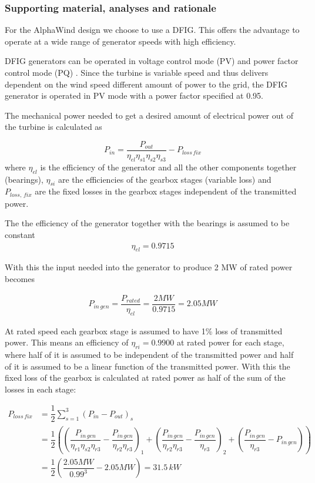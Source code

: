 \subsubsection{Supporting material, analyses and rationale}

For the AlphaWind design we choose to use a DFIG. This offers the advantage to operate at a wide range of generator speeds with high efficiency.

DFIG generators can be operated in voltage control mode (PV) and power factor control mode (PQ) \cite{Londero2012}. Since the turbine is variable speed and thus delivers dependent on the wind speed different amount of power to the grid, the DFIG generator is operated in PV mode with a power factor specified at 0.95.

The mechanical power needed to get a desired amount of electrical power out of the turbine is calculated as

\begin{equation}
    P_{in} = \dfrac{P_{out}}{\eta_{el}\eta_{s1}\eta_{s2}\eta_{s3}} - P_{loss\,fix}
    \label{eq:P_in}
\end{equation}
where $\eta_{el}$ is the efficiency of the generator and all the other components together (bearings), $\eta_{si}$ are the efficiencies of the gearbox stages (variable loss) and $P_{loss, \, fix}$ are the fixed losses in the gearbox stages independent of the transmitted power.


The the efficiency of the generator together with the bearings is assumed to be constant
\begin{align}
    \eta_{el} = 0.9715
\end{align}

With this the input needed into the generator to produce 2 MW of rated power becomes

\begin{align}
    P_{in\,gen} = \dfrac{P_{rated}}{\eta_{el}} = \dfrac{2 MW}{0.9715} = 2.05 MW
\end{align}

At rated speed each gearbox stage is assumed to have 1\% loss of transmitted power. This means an efficiency of $\eta_{ri} = 0.9900$ at rated power for each stage, where half of it is assumed to be independent of the transmitted power and half of it is assumed to be a linear function of the transmitted power. With this the fixed loss of the gearbox is calculated at rated power as half of the sum of the losses in each stage: 

\begin{align}
    P_{loss\,fix} &= \dfrac{1}{2} \sum \limits_{s = 1}^{3} \left( P_{in} - P_{out}\right)_{s}\\
    &= \dfrac{1}{2} \left( \left( \dfrac{P_{in\,gen}}{\eta_{r1}\eta_{s2} \eta_{r3}} - \dfrac{P_{in\,gen}}{\eta_{r2} \eta_{r3}} \right)_{1} + \left( \dfrac{P_{in\,gen}}{\eta_{r2} \eta_{r3}} - \dfrac{P_{in\,gen}}{\eta_{r3}}\right)_{2}+ \left( \dfrac{P_{in\,gen}}{\eta_{r3}} - P_{in\,gen} \right) \right)\\
    &= \dfrac{1}{2} \left( \dfrac{2.05 MW}{0.99^3} - 2.05 MW \right) = 31.5 \,kW
\end{align}

